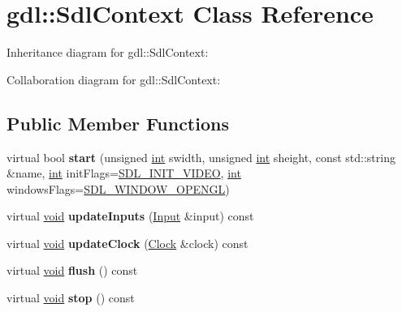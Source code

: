\hypertarget{classgdl_1_1_sdl_context}{}\section{gdl\+:\+:Sdl\+Context Class Reference}
\label{classgdl_1_1_sdl_context}


Inheritance diagram for gdl\+:\+:Sdl\+Context\+:


Collaboration diagram for gdl\+:\+:Sdl\+Context\+:
\subsection*{Public Member Functions}
\begin{DoxyCompactItemize}
\item 
\hypertarget{classgdl_1_1_sdl_context_ae0bfc3b199fa14280472aad086b8a02e}{}virtual bool {\bfseries start} (unsigned \hyperlink{_s_d_l__thread_8h_a6a64f9be4433e4de6e2f2f548cf3c08e}{int} swidth, unsigned \hyperlink{_s_d_l__thread_8h_a6a64f9be4433e4de6e2f2f548cf3c08e}{int} sheight, const std\+::string \&name, \hyperlink{_s_d_l__thread_8h_a6a64f9be4433e4de6e2f2f548cf3c08e}{int} init\+Flags=\hyperlink{_s_d_l_8h_afc988e510ed522628ffeb7c76f80c233}{S\+D\+L\+\_\+\+I\+N\+I\+T\+\_\+\+V\+I\+D\+E\+O}, \hyperlink{_s_d_l__thread_8h_a6a64f9be4433e4de6e2f2f548cf3c08e}{int} windows\+Flags=\hyperlink{_s_d_l__video_8h_ab10f4fd6a082ef06fcae96860c95fb18a5cf8af096f1870b0c2b12267cabd1f7a}{S\+D\+L\+\_\+\+W\+I\+N\+D\+O\+W\+\_\+\+O\+P\+E\+N\+G\+L})\label{classgdl_1_1_sdl_context_ae0bfc3b199fa14280472aad086b8a02e}

\item 
\hypertarget{classgdl_1_1_sdl_context_a61fc070d60394641ab6bdf7710db280b}{}virtual \hyperlink{_s_d_l__audio_8h_a52835ae37c4bb905b903cbaf5d04b05f}{void} {\bfseries update\+Inputs} (\hyperlink{classgdl_1_1_input}{Input} \&input) const \label{classgdl_1_1_sdl_context_a61fc070d60394641ab6bdf7710db280b}

\item 
\hypertarget{classgdl_1_1_sdl_context_a68f451a110573ac1d8b4596b3403c169}{}virtual \hyperlink{_s_d_l__audio_8h_a52835ae37c4bb905b903cbaf5d04b05f}{void} {\bfseries update\+Clock} (\hyperlink{classgdl_1_1_clock}{Clock} \&clock) const \label{classgdl_1_1_sdl_context_a68f451a110573ac1d8b4596b3403c169}

\item 
\hypertarget{classgdl_1_1_sdl_context_a4743f79b26975d700ef13f3bf1890407}{}virtual \hyperlink{_s_d_l__audio_8h_a52835ae37c4bb905b903cbaf5d04b05f}{void} {\bfseries flush} () const \label{classgdl_1_1_sdl_context_a4743f79b26975d700ef13f3bf1890407}

\item 
\hypertarget{classgdl_1_1_sdl_context_a4c9b37b38e6ada7222f7d7bec3d1fbcf}{}virtual \hyperlink{_s_d_l__audio_8h_a52835ae37c4bb905b903cbaf5d04b05f}{void} {\bfseries stop} () const \label{classgdl_1_1_sdl_context_a4c9b37b38e6ada7222f7d7bec3d1fbcf}

\end{DoxyCompactItemize}

